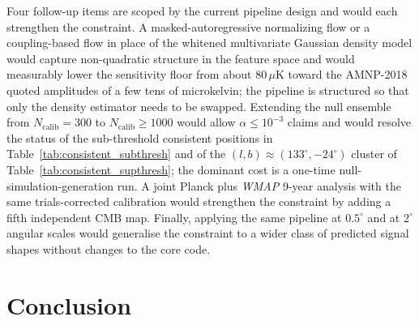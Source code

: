 \documentclass[preprint,12pt,nonatbib]{elsarticle}
\begin{document}
Four follow-up items are scoped by the current pipeline design and would each strengthen the constraint. A masked-autoregressive normalizing flow \citep{papamakarios_2017} or a coupling-based flow \citep{dinh_2016} in place of the whitened multivariate Gaussian density model would capture non-quadratic structure in the feature space and would measurably lower the sensitivity floor from about $80\,\mu\mathrm{K}$ toward the AMNP-2018 quoted amplitudes of a few tens of microkelvin; the pipeline is structured so that only the density estimator needs to be swapped. Extending the null ensemble from $N_{\text{calib}} = 300$ to $N_{\text{calib}} \ge 1000$ would allow $\alpha \le 10^{-3}$ claims and would resolve the status of the sub-threshold consistent positions in Table~\ref{tab:consistent_subthresh} and of the $(l, b) \approx (133^\circ, -24^\circ)$ cluster of Table~\ref{tab:consistent_supthresh}; the dominant cost is a one-time null-simulation-generation run. A joint Planck plus \emph{WMAP} 9-year \citep{bennett_2013} analysis with the same trials-corrected calibration would strengthen the constraint by adding a fifth independent CMB map. Finally, applying the same pipeline at $0.5^\circ$ and at $2^\circ$ angular scales would generalise the constraint to a wider class of predicted signal shapes without changes to the core code.

\section{Conclusion}\label{sec:conclusion}
\end{document}
